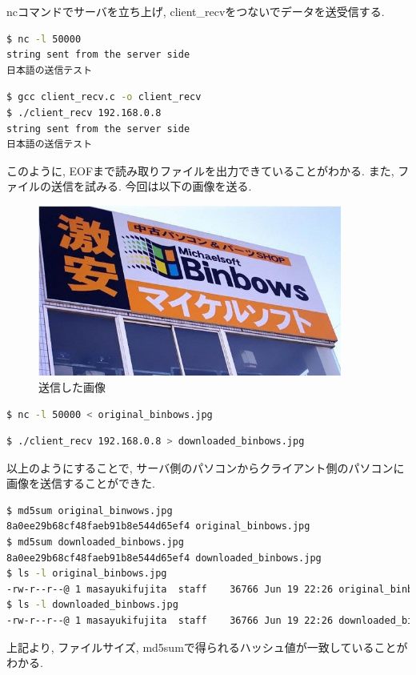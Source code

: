 \documentclass{ltjsarticle}
\begin{document}
ncコマンドでサーバを立ち上げ, client\_recvをつないでデータを送受信する. 
\begin{lstlisting}[caption=サーバ側,language=bash]
$ nc -l 50000
string sent from the server side
日本語の送信テスト
\end{lstlisting}
\begin{lstlisting}[caption=クライアント側,language=bash]
$ gcc client_recv.c -o client_recv
$ ./client_recv 192.168.0.8
string sent from the server side
日本語の送信テスト
\end{lstlisting}
このように, EOFまで読み取りファイルを出力できていることがわかる. また, ファイルの送信を試みる. 今回は以下の画像を送る. 
\begin{figure}[H]
    \begin{center}
        \includegraphics[width=10cm]{binbows.jpg}
        \caption{送信した画像}
    \end{center}
\end{figure}
\begin{lstlisting}[caption=サーバ側,language=bash]
$ nc -l 50000 < original_binbows.jpg
\end{lstlisting}

\begin{lstlisting}[caption=クライアント側,language=bash]
$ ./client_recv 192.168.0.8 > downloaded_binbows.jpg
\end{lstlisting}
以上のようにすることで, サーバ側のパソコンからクライアント側のパソコンに画像を送信することができた. 
\begin{lstlisting}[caption=ファイルサイズとハッシュ値の確認,language=bash]
$ md5sum original_binwows.jpg 
8a0ee29b68cf48faeb91b8e544d65ef4 original_binbows.jpg
$ md5sum downloaded_binbows.jpg
8a0ee29b68cf48faeb91b8e544d65ef4 downloaded_binbows.jpg
$ ls -l original_binbows.jpg
-rw-r--r--@ 1 masayukifujita  staff    36766 Jun 19 22:26 original_binbows.jpg
$ ls -l downloaded_binbows.jpg
-rw-r--r--@ 1 masayukifujita  staff    36766 Jun 19 22:26 downloaded_binbows.jpg
\end{lstlisting}
上記より, ファイルサイズ, md5sumで得られるハッシュ値が一致していることがわかる. 
\end{document}
